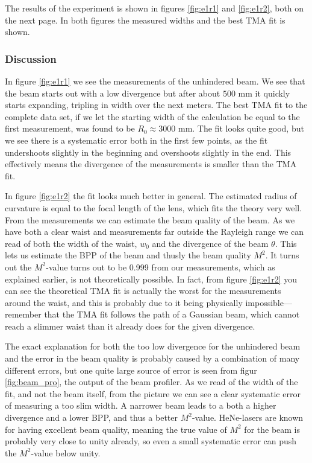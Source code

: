 \documentclass[a4paper, 11pt, notitlepage, english]{article}
\begin{document}
The results of the experiment is shown in figures \ref{fig:e1r1} and \ref{fig:e1r2}, both on the next page. In both figures the measured widths and the best TMA fit is shown.

\subsubsection{Discussion}

In figure \ref{fig:e1r1} we see the measurements of the unhindered beam. We see that the beam starts out with a low divergence but after about $500$ mm it quickly starts expanding, tripling in width over the next meters. The best TMA fit to the complete data set, if we let the starting width of the calculation be equal to the first measurement, was found to be $R_0\approx 3000$ mm. The fit looks quite good, but we see there is a systematic error both in the first few points, as the fit undershoots slightly in the beginning and overshoots slightly in the end. This effectively means the divergence of the measurements is smaller than the TMA fit.

In figure \ref{fig:e1r2} the fit looks much better in general. The estimated radius of curvature is equal to the focal length of the lens, which fits the theory very well. From the measurements we can estimate the beam quality of the beam. As we have both a clear waist and measurements far outside the Rayleigh range we can read of both the width of the waist, $w_0$ and the divergence of the beam $\theta$. This lets us estimate the BPP of the beam and thusly the beam quality $M^2$. It turns out the $M^2$-value turns out to be 0.999 from our measurements, which as explained earlier, is not theoretically possible. In fact, from figure \ref{fig:e1r2} you can see the theoretical TMA fit is actually the worst for the measurements around the waist, and this is probably due to it being physically impossible---remember that the TMA fit follows the path of a Gaussian beam, which cannot reach a slimmer waist than it already does for the given divergence.

The exact explanation for both the too low divergence for the unhindered beam and the error in the beam quality is probably caused by a combination of many different errors, but one quite large source of error is seen from figur \ref{fig:beam_pro}, the output of the beam profiler. As we read of the width of the fit, and not the beam itself, from the picture we can see a clear systematic error of measuring a too slim width. A narrower beam leads to a both a higher divergence and a lower BPP, and thus a better $M^2$-value. HeNe-lasers are known for having excellent beam quality, meaning the true value of $M^2$ for the beam is probably very close to unity already, so even a small systematic error can push the $M^2$-value below unity.
\end{document}
